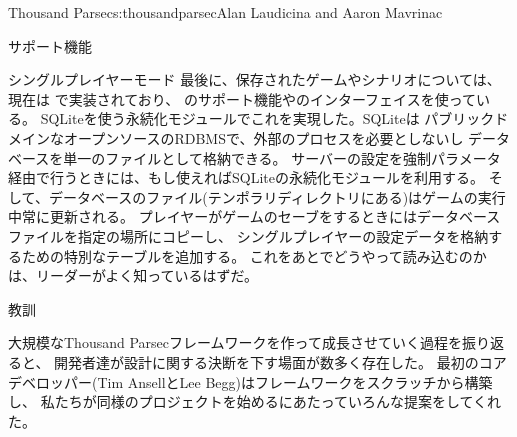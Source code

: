 \begin{aosachapter}{Thousand Parsec}{s:thousandparsec}{Alan Laudicina and Aaron Mavrinac}
\begin{aosasect1}{サポート機能}
\begin{aosasect2}{シングルプレイヤーモード}
最後に、保存されたゲームやシナリオについては、現在は
で実装されており、
のサポート機能やのインターフェイスを使っている。
SQLiteを使う永続化モジュールでこれを実現した。SQLiteは
パブリックドメインなオープンソースのRDBMSで、外部のプロセスを必要としないし
データベースを単一のファイルとして格納できる。
サーバーの設定を強制パラメータ経由で行うときには、もし使えればSQLiteの永続化モジュールを利用する。
そして、データベースのファイル(テンポラリディレクトリにある)はゲームの実行中常に更新される。
プレイヤーがゲームのセーブをするときにはデータベースファイルを指定の場所にコピーし、
シングルプレイヤーの設定データを格納するための特別なテーブルを追加する。
これをあとでどうやって読み込むのかは、リーダーがよく知っているはずだ。

\end{aosasect2}

\end{aosasect1}

\begin{aosasect1}{教訓}

大規模なThousand Parsecフレームワークを作って成長させていく過程を振り返ると、
開発者達が設計に関する決断を下す場面が数多く存在した。
最初のコアデベロッパー(Tim AnsellとLee Begg)はフレームワークをスクラッチから構築し、
私たちが同様のプロジェクトを始めるにあたっていろんな提案をしてくれた。


\end{aosasect1}
\end{aosachapter}
